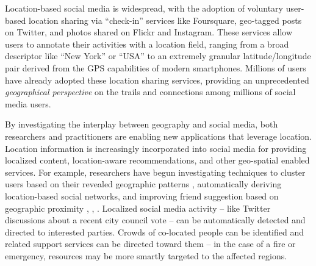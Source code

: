 \ifdefined\THESIS
    \pagestyle{plain} %
    \setcounter{page}{1}
\else
\fi



Location-based social media is widespread, with the adoption of voluntary
user-based location sharing via ``check-in'' services like Foursquare,
geo-tagged posts on Twitter, and photos shared on Flickr and Instagram.
%
These services allow users to annotate their activities with a location field,
ranging from a broad descriptor like ``New York'' or ``USA'' to an extremely
granular latitude/longitude pair  derived from the GPS capabilities of modern
smartphones.
%
Millions of users have already adopted these location sharing services,
providing an unprecedented \textit{geographical perspective} on the trails and
connections among millions of social media users.

By investigating the interplay between geography and social media, both
researchers and practitioners are enabling new applications that leverage
location.
%
Location information is increasingly incorporated into social media for
providing localized content, location-aware recommendations, and other
geo-spatial enabled services.
%
For example, researchers have begun investigating techniques to cluster users
based on their revealed geographic patterns \cite{scellato2010distance},
automatically deriving location-based social networks, and improving friend
suggestion based on geographic proximity \cite{cranshaw2010bridging},
\cite{wang2011human}, \cite{crandall2010inferring}.
%
Localized social media activity -- like Twitter discussions about a recent city
council vote -- can be automatically detected and directed to interested
parties.
%
Crowds of co-located people can be identified and related support services can
be directed toward them -- in the case of a fire or emergency, resources may be
more smartly targeted to the affected regions.



